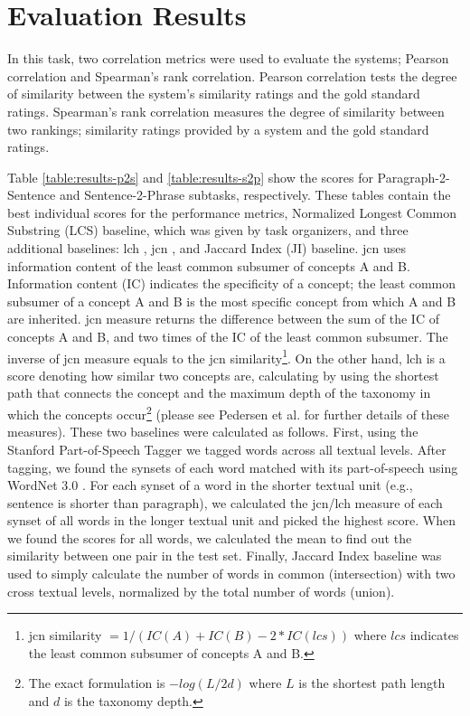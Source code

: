 \documentclass[11pt]{article}
\begin{document}
\section{Evaluation Results}
\label{evaluation}

In this task, two correlation metrics were used to evaluate the systems; Pearson correlation and Spearman's rank correlation.  Pearson correlation tests the degree of similarity between the system's similarity ratings and the gold standard ratings. Spearman's rank correlation measures the degree of similarity between two rankings; similarity ratings provided by a system and the gold standard ratings.

Table \ref{table:results-p2s} and \ref{table:results-s2p} show the scores for Paragraph-2-Sentence and Sentence-2-Phrase subtasks, respectively. These tables contain the best individual scores for the performance metrics, Normalized Longest Common Substring (LCS) baseline, which was given by task organizers, and three additional baselines: lch \cite{leacock1998combining}, jcn \cite{jiang1997semantic}, and Jaccard Index (JI) baseline. jcn uses information content \cite{resnik1995inforcontent} of the least common subsumer  of concepts A and B. Information content (IC) indicates the specificity of a concept; the least common subsumer of a concept A and B is the most specific concept from which A and B are inherited. jcn measure returns the difference between the sum of the IC of concepts A and B, and two times of the IC of the least common subsumer. The inverse of jcn measure equals to the jcn similarity\footnote{jcn similarity $= 1 / (IC(A) + IC(B) - 2 * IC(lcs))$ where $lcs$ indicates the least common subsumer of concepts A and B.}. On the other hand, lch is a score denoting how similar two concepts are, calculating by using the shortest path that connects the concept and the maximum depth of the taxonomy in which the concepts occur\footnote{The exact formulation is $-log(L/2d)$ where $L$ is the shortest path length and $d$ is the taxonomy depth.} (please see Pedersen et al.  for further details of these measures). These two baselines were calculated as follows. First, using the Stanford Part-of-Speech Tagger \cite{toutanova2000enriching} we tagged words across all textual levels. After tagging, we found the synsets of each word matched with its part-of-speech using WordNet 3.0 \cite{fellbaum98electronic}. For each synset of a word in the shorter textual unit (e.g., sentence is shorter than paragraph), we calculated the jcn/lch measure of each synset of all words in the longer textual unit and picked the highest score. When we found the scores for all words, we calculated the mean to find out the similarity between one pair in the test set. Finally, Jaccard Index baseline was used to simply 
calculate the number of words in common (intersection) with two cross textual levels, normalized by the total number of words (union). 
\end{document}
